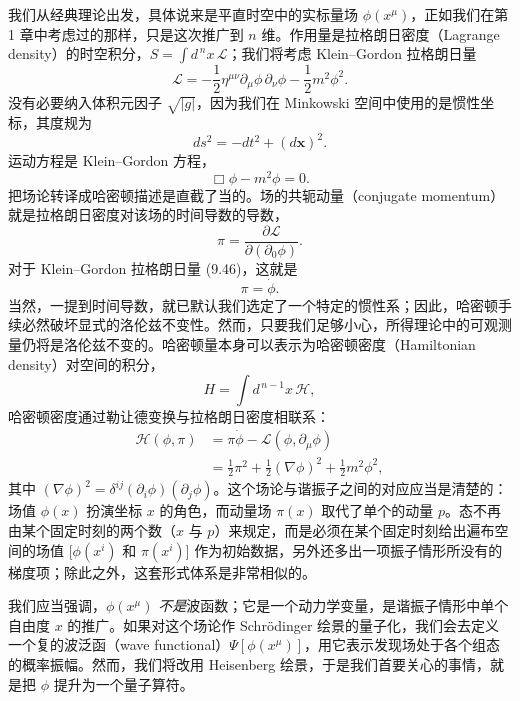 我们从经典理论出发，具体说来是平直时空中的实标量场 $\phi(x^{\mu})$，正如我们在第 1 章中考虑过的那样，只是这次推广到 $n$ 维。作用量是拉格朗日密度（Lagrange density）的时空积分，$S = \int d^{\,n}x\,\mathcal{L}$；我们将考虑 Klein–Gordon 拉格朗日量
\begin{equation*}
\mathcal{L} = -\frac{1}{2}\eta^{\mu\nu}\partial_\mu\phi\,\partial_\nu\phi - \frac{1}{2}m^2\phi^2.
\tag{9.46}
\end{equation*}
没有必要纳入体积元因子 $\sqrt{|g|}$，因为我们在 Minkowski 空间中使用的是惯性坐标，其度规为
\begin{equation*}
ds^2 = -dt^2 + (d\mathbf{x})^2.
\tag{9.47}
\end{equation*}
运动方程是 Klein–Gordon 方程，
\begin{equation*}
\Box\phi - m^2\phi = 0.
\tag{9.48}
\end{equation*}
把场论转译成哈密顿描述是直截了当的。场的共轭动量（conjugate momentum）就是拉格朗日密度对该场的时间导数的导数，
\begin{equation*}
\pi = \frac{\partial\mathcal{L}}{\partial(\partial_0\phi)}.
\tag{9.49}
\end{equation*}
对于 Klein–Gordon 拉格朗日量 (9.46)，这就是
\begin{equation*}
\pi = \dot{\phi}.
\tag{9.50}
\end{equation*}
当然，一提到时间导数，就已默认我们选定了一个特定的惯性系；因此，哈密顿手续必然破坏显式的洛伦兹不变性。然而，只要我们足够小心，所得理论中的可观测量仍将是洛伦兹不变的。哈密顿量本身可以表示为哈密顿密度（Hamiltonian density）对空间的积分，
\begin{equation*}
H = \int d^{\,n-1}x\,\mathcal{H},
\tag{9.51}
\end{equation*}
哈密顿密度通过勒让德变换与拉格朗日密度相联系：
\begin{align*}
\mathcal{H}(\phi,\pi) &= \pi\dot{\phi} - \mathcal{L}(\phi,\partial_\mu\phi) \\
&= \frac{1}{2}\pi^2 + \frac{1}{2}(\nabla\phi)^2 + \frac{1}{2}m^2\phi^2,
\tag{9.52}
\end{align*}
其中 $(\nabla\phi)^2 = \delta^{ij}(\partial_i\phi)(\partial_j\phi)$。这个场论与谐振子之间的对应应当是清楚的：场值 $\phi(x)$ 扮演坐标 $x$ 的角色，而动量场 $\pi(x)$ 取代了单个的动量 $p$。态不再由某个固定时刻的两个数（$x$ 与 $p$）来规定，而是必须在某个固定时刻给出遍布空间的场值 $[\phi(x^i)$ 和 $\pi(x^i)]$ 作为初始数据，另外还多出一项振子情形所没有的梯度项；除此之外，这套形式体系是非常相似的。

我们应当强调，$\phi(x^{\mu})$ \emph{不是}波函数；它是一个动力学变量，是谐振子情形中单个自由度 $x$ 的推广。如果对这个场论作 Schrödinger 绘景的量子化，我们会去定义一个复的波泛函（wave functional）$\Psi[\phi(x^{\mu})]$，用它表示发现场处于各个组态的概率振幅。然而，我们将改用 Heisenberg 绘景，于是我们首要关心的事情，就是把 $\phi$ 提升为一个量子算符。

